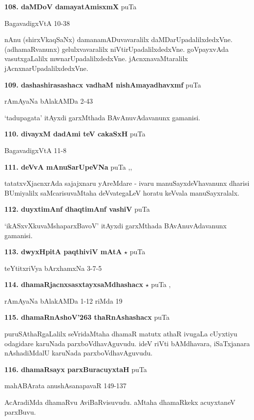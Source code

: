 \medskip
\noindent\textbf{108. daMDoV damayatAmisxmX} \hfill puTa \pageref{93}

\hfill BagavadigxVtA 10-38

nAnu (shirxVkaqSaNx) damanamADuvavaralilx daMDarUpadalilxdedxVne. (adhamaRvanunx) gelulxvavaralilx niVtirUpadalilxdedxVne. goVpayxvAda vasutxgaLalilx mwnarUpadalilxdedxVne. jAcnxnavaMtaralilx jAcnxnarUpadalilxdedxVne.

\medskip
\noindent\textbf{109. dashashirasashacx vadhaM nishAmayadhavxmf} \hfill puTa \pageref{207}

\hfill rAmAyaNa bAlakAMDa 2-43

`tadupagata' itAyxdi garxMthada BAvAnuvAdavanunx gamanisi.

\medskip
\noindent\textbf{110. divayxM dadAmi teV cakaSxH} \hfill puTa \pageref{91b}

\hfill BagavadigxVtA 11-8

\medskip
\noindent\textbf{111. deVvA mAnuSarUpeVNa} \hfill puTa \pageref{146b},\pageref{225b},\pageref{247a}

tatatxvXjacnxrAda sajajxnaru yAreMdare - ivaru manuSayxdeVhavanunx dharisi BUmiyalilx saMcarisuvaMtaha deVvategaLeV horatu keVvala manuSayxralalx. 

\medskip
\noindent\textbf{112. duyxtimAnf dhaqtimAnf vashiV} \hfill puTa \pageref{249}

`ikASxvXkuvaMshaparxBavoV' itAyxdi garxMthada BAvAnuvAdavanunx gamanisi.

\medskip
\noindent\textbf{113. dwyxHpitA paqthiviV mAtA} $\star$ \hfill puTa \pageref{21}

\hfill teYtitxriVya bArxhamxNa 3-7-5

\medskip
\noindent\textbf{114. dhamaRjacnxsasxtayxsaMdhashacx} $\star$ \hfill puTa \pageref{155},\pageref{223}

\hfill rAmAyaNa bAlakAMDa 1-12 riMda 19

\medskip
\noindent\textbf{115. dhamaRnAshoV\char'263 thaRnAshashacx} \hfill puTa \pageref{199a}

puruSAthaRgaLalilx seVridaMtaha dhamaR matutx athaR ivugaLa cUyxtiyu odagidare karuNada parxboVdhavAguvudu. ideV riVti bAMdhavara, iSaTxjanara nAshadiMdalU karuNada parxboVdhavAguvudu.

\medskip
\noindent\textbf{116. dhamaRsayx parxBuracuyxtaH} \hfill puTa \pageref{90a}

\hfill mahABArata anushAsanapavaR 149-137

AcAradiMda dhamaRvu AviBaRvisuvudu. aMtaha dhamaRkekx acuyxtaneV parxBuvu.

